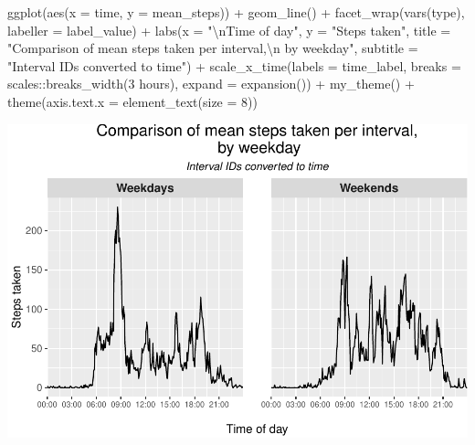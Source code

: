 \documentclass[
  paper=a4,
  ,captions=tableheading
]{scrartcl}
\newenvironment{Shaded}{\begin{snugshade}}{\end{snugshade}}
\newcommand{\AttributeTok}[1]{\textcolor[rgb]{0.77,0.63,0.00}{#1}}
\newcommand{\DecValTok}[1]{\textcolor[rgb]{0.00,0.00,0.81}{#1}}
\newcommand{\FunctionTok}[1]{\textcolor[rgb]{0.00,0.00,0.00}{#1}}
\newcommand{\NormalTok}[1]{#1}
\newcommand{\SpecialCharTok}[1]{\textcolor[rgb]{0.00,0.00,0.00}{#1}}
\newcommand{\StringTok}[1]{\textcolor[rgb]{0.31,0.60,0.02}{#1}}
\begin{document}
\begin{Shaded}
\begin{Highlighting}[]
\FunctionTok{ggplot}\NormalTok{(}\FunctionTok{aes}\NormalTok{(}\AttributeTok{x =}\NormalTok{ time, }\AttributeTok{y =}\NormalTok{ mean\_steps)) }\SpecialCharTok{+}
  \FunctionTok{geom\_line}\NormalTok{() }\SpecialCharTok{+}
  \FunctionTok{facet\_wrap}\NormalTok{(}\FunctionTok{vars}\NormalTok{(type), }\AttributeTok{labeller =}\NormalTok{ label\_value) }\SpecialCharTok{+}
  \FunctionTok{labs}\NormalTok{(}\AttributeTok{x =} \StringTok{"}\SpecialCharTok{\textbackslash{}n}\StringTok{Time of day"}\NormalTok{,}
       \AttributeTok{y =} \StringTok{"Steps taken"}\NormalTok{,}
       \AttributeTok{title =} \StringTok{"Comparison of mean steps taken per interval,}\SpecialCharTok{\textbackslash{}n}\StringTok{ by weekday"}\NormalTok{,}
       \AttributeTok{subtitle =} \StringTok{"Interval IDs converted to time"}\NormalTok{) }\SpecialCharTok{+}
  \FunctionTok{scale\_x\_time}\NormalTok{(}\AttributeTok{labels =}\NormalTok{ time\_label,}
               \AttributeTok{breaks =}\NormalTok{ scales}\SpecialCharTok{::}\FunctionTok{breaks\_width}\NormalTok{(}\StringTok{\textquotesingle{}3 hours\textquotesingle{}}\NormalTok{),}
               \AttributeTok{expand =} \FunctionTok{expansion}\NormalTok{()) }\SpecialCharTok{+}
  \FunctionTok{my\_theme}\NormalTok{() }\SpecialCharTok{+}
  \FunctionTok{theme}\NormalTok{(}\AttributeTok{axis.text.x =} \FunctionTok{element\_text}\NormalTok{(}\AttributeTok{size =} \DecValTok{8}\NormalTok{))}
\end{Highlighting}
\end{Shaded}

\begin{center}\includegraphics[width=0.6\linewidth]{PA1_template_files/figure-latex/weekday-plot-1} \end{center}
\end{document}
